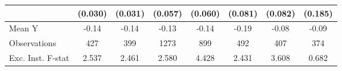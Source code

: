 {\begin{tabular}{l*{7}{c}}
            &     (0.030)         &     (0.031)         &     (0.057)         &     (0.060)         &     (0.081)         &     (0.082)         &     (0.185)         \\
\midrule
Mean Y      &       -0.14         &       -0.14         &       -0.13         &       -0.14         &       -0.19         &       -0.08         &       -0.09         \\
Observations&         427         &         399         &        1273         &         899         &         492         &         407         &         374         \\
Exc. Inst. F-stat&       2.537         &       2.461         &       2.580         &       4.428         &       2.431         &       3.608         &       0.682         \\
\bottomrule
\end{tabular}
}
